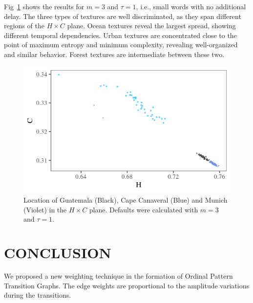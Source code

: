 \documentclass{isprs}
\begin{document}
Fig~\ref{fig:D3T1} shows the results for $m = 3$ and $\tau = 1$, i.e., small words with no additional delay.
The three types of textures are well discriminated, as they span different regions of the $H\times C$ plane.
Ocean textures reveal the largest spread, showing different temporal dependencies.
Urban textures are concentrated close to the point of maximum entropy and minimum complexity, revealing well-organized and similar behavior.
Forest textures are intermediate between these two.

\begin{figure}[hbt]
	\centering
	\includegraphics[width=\columnwidth]{Figures/transitionGraphD3t1.png}
	\caption{Location of Guatemala (Black), Cape Canaveral (Blue) and Munich (Violet) in the $H \times C$ plane. Defaults were calculated with $m = 3$ and $\tau = 1$.}
	\label{fig:D3T1}
\end{figure}




\section{CONCLUSION}\label{Conclusion}

We proposed a new weighting technique in the formation of Ordinal Pattern Transition Graphs.
The edge weights are proportional to the amplitude variations during the transitions.
\end{document}

